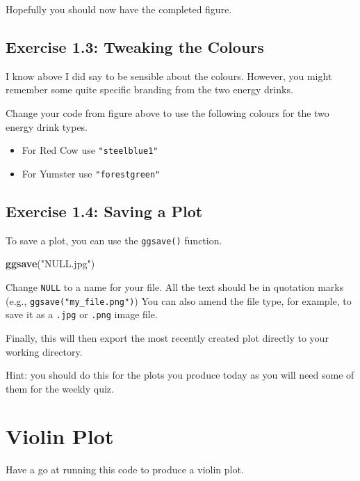 \documentclass[
]{book}
\newenvironment{Shaded}{\begin{snugshade}}{\end{snugshade}}
\newcommand{\FunctionTok}[1]{\textcolor[rgb]{0.13,0.29,0.53}{\textbf{#1}}}
\newcommand{\NormalTok}[1]{#1}
\newcommand{\StringTok}[1]{\textcolor[rgb]{0.31,0.60,0.02}{#1}}
\providecommand{\tightlist}{%
  \setlength{\itemsep}{0pt}\setlength{\parskip}{0pt}}
\let\oldsection\section
\renewcommand{\section}{\needspace{5\baselineskip}\oldsection}
\let\oldsubsection\subsection
\renewcommand{\subsection}{\needspace{3\baselineskip}\oldsubsection}  %
\begin{document}
Hopefully you should now have the completed figure.

\subsection{Exercise 1.3: Tweaking the Colours}\label{exercise-1.3-tweaking-the-colours}

I know above I did say to be sensible about the colours. However, you might remember some quite specific branding from the two energy drinks.

Change your code from figure above to use the following colours for the two energy drink types.

\begin{itemize}
\tightlist
\item
  For Red Cow use \texttt{"steelblue1"}
\item
  For Yumster use \texttt{"forestgreen"}
\end{itemize}

\subsection{Exercise 1.4: Saving a Plot}\label{exercise-1.4-saving-a-plot}

To save a plot, you can use the \texttt{ggsave()} function.

\begin{Shaded}
\begin{Highlighting}[]
\FunctionTok{ggsave}\NormalTok{(}\StringTok{"NULL.jpg"}\NormalTok{)}
\end{Highlighting}
\end{Shaded}

Change \texttt{NULL} to a name for your file. All the text should be in quotation marks (e.g., \texttt{ggsave("my\_file.png")}) You can also amend the file type, for example, to save it as a \texttt{.jpg} or \texttt{.png} image file.

Finally, this will then export the most recently created plot directly to your working directory.

Hint: you should do this for the plots you produce today as you will need some of them for the weekly quiz.

\section{Violin Plot}\label{violin-plot}

Have a go at running this code to produce a violin plot.
\end{document}
